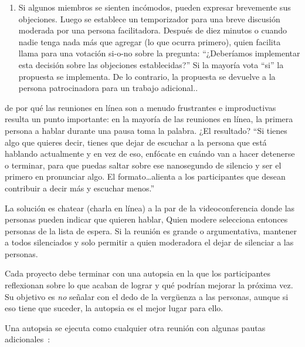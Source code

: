 \begin{enumerate}
\item
  Si algunos miembros se sienten incómodos, pueden expresar brevemente sus objeciones.
  Luego se establece un temporizador para una breve discusión moderada por una persona facilitadora.
  Después de diez minutos o cuando nadie tenga nada más que agregar (lo que ocurra primero),
  quien facilita llama para una votación si-o-no sobre la pregunta:
  ``¿Deberíamos implementar esta decisión sobre las objeciones establecidas?''
  Si la mayoría vota ``si'' la propuesta se implementa.
  De lo contrario, la propuesta se devuelve a la persona patrocinadora para un trabajo adicional..

\end{enumerate}


de por qué las reuniones en línea son a menudo frustrantes e improductivas 
resulta un punto importante:
en la mayoría de las reuniones en línea,
la primera persona a hablar durante una pausa toma la palabra.
¿El resultado?
``Si tienes algo que quieres decir,
tienes que dejar de escuchar a la persona que está hablando actualmente
y en vez de eso, enfócate en cuándo van a hacer detenerse o terminar, 
para que puedas saltar sobre ese nanosegundo de silencio y ser el primero en pronunciar algo.
El formato{\ldots}alienta a los participantes que desean contribuir a decir más y escuchar menos.''

La solución es chatear (charla en línea) a la par de la videoconferencia
donde las personas pueden indicar que quieren hablar,
Quien modere selecciona entonces personas de la lista de espera.
Si la reunión es grande o argumentativa,
mantener a todos silenciados
y solo permitir a quien moderadora el dejar de silenciar a las personas.


Cada proyecto debe terminar con una autopsia
en la que los participantes reflexionan sobre lo que acaban de lograr
y qué podrían mejorar la próxima vez.
Su objetivo es \emph{no} señalar con el dedo de la vergüenza a las personas,
aunque si eso tiene que suceder,
la autopsia es el mejor lugar para ello.

Una autopsia se ejecuta como cualquier otra reunión
con algunas pautas adicionales~\cite{Derb2006}:

